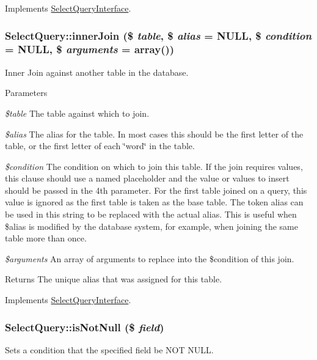 Implements \hyperlink{interfaceSelectQueryInterface_a5b33d0a9d60cb31a705d590ae1cf8bef}{SelectQueryInterface}.\hypertarget{classSelectQuery_a2e3bad44c2eca1e74130622a93fdc394}{
\subsubsection[{innerJoin}]{\setlength{\rightskip}{0pt plus 5cm}SelectQuery::innerJoin (\$ {\em table}, \/  \$ {\em alias} = {\ttfamily NULL}, \/  \$ {\em condition} = {\ttfamily NULL}, \/  \$ {\em arguments} = {\ttfamily array()})}}
\label{classSelectQuery_a2e3bad44c2eca1e74130622a93fdc394}
Inner Join against another table in the database.


\begin{DoxyParams}{Parameters}
\item[{\em \$table}]The table against which to join. \item[{\em \$alias}]The alias for the table. In most cases this should be the first letter of the table, or the first letter of each \char`\"{}word\char`\"{} in the table. \item[{\em \$condition}]The condition on which to join this table. If the join requires values, this clause should use a named placeholder and the value or values to insert should be passed in the 4th parameter. For the first table joined on a query, this value is ignored as the first table is taken as the base table. The token alias can be used in this string to be replaced with the actual alias. This is useful when \$alias is modified by the database system, for example, when joining the same table more than once. \item[{\em \$arguments}]An array of arguments to replace into the \$condition of this join. \end{DoxyParams}
\begin{DoxyReturn}{Returns}
The unique alias that was assigned for this table. 
\end{DoxyReturn}


Implements \hyperlink{interfaceSelectQueryInterface_ab359fd116625504a297d7fd4222f2564}{SelectQueryInterface}.\hypertarget{classSelectQuery_a52334c418025609d024d2a21c6e487ea}{
\subsubsection[{isNotNull}]{\setlength{\rightskip}{0pt plus 5cm}SelectQuery::isNotNull (\$ {\em field})}}
\label{classSelectQuery_a52334c418025609d024d2a21c6e487ea}
Sets a condition that the specified field be NOT NULL.


